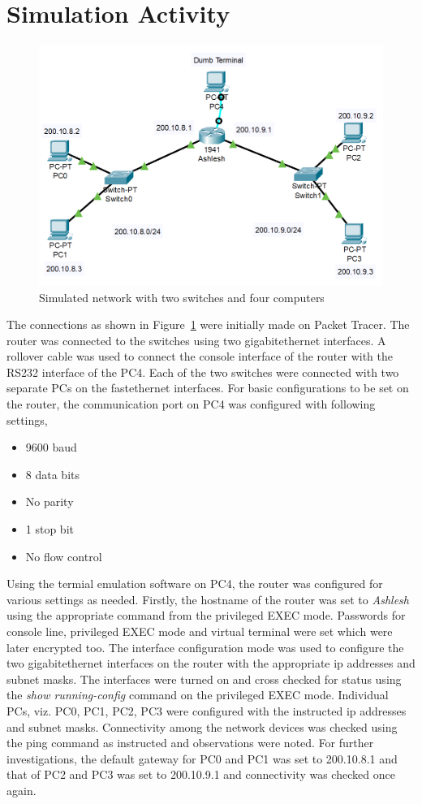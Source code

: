 \documentclass{lab_sheet}
\begin{document}
    \section{Simulation Activity}
    \begin{figure}[H]
        \centering
        \includegraphics[scale=0.7]{./Figures/simulation.png}
        \caption{Simulated network with two switches and four computers}
        \label{fig:simulation}
    \end{figure}
    The connections as shown in Figure~\ref{fig:simulation} were initially made on Packet Tracer. The router was connected to the switches using two gigabitethernet interfaces. A rollover cable was used to connect the console interface of the router with the RS232 interface of the PC4. Each of the two switches were connected with two separate PCs on the fastethernet interfaces. For basic configurations to be set on the router, the communication port on PC4 was configured with following settings,
    \begin{itemize}
        \item 9600 baud
        \item 8 data bits
        \item No parity
        \item 1 stop bit
        \item No flow control
    \end{itemize}
    Using the termial emulation software on PC4, the router was configured for various settings as needed. Firstly, the hostname of the router was set to \textit{Ashlesh} using the appropriate command from the privileged EXEC mode. Passwords for console line, privileged EXEC mode and virtual terminal were set which were later encrypted too. The interface configuration mode was used to configure the two gigabitethernet interfaces on the router with the appropriate ip addresses and subnet masks. The interfaces were turned on and cross checked for status using the \textit{show running-config} command on the privileged EXEC mode. Individual PCs, viz. PC0, PC1, PC2, PC3 were configured with the instructed ip addresses and subnet masks. Connectivity among the network devices was checked using the ping command as instructed and observations were noted. For further investigations, the default gateway for PC0 and PC1 was set to 200.10.8.1 and that of PC2 and PC3 was set to 200.10.9.1 and connectivity was checked once again.\\
\end{document}
